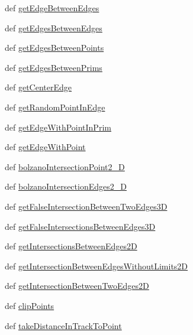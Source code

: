 \begin{DoxyCompactItemize}
\item 
def \hyperlink{namespacelib_1_1_geo_math_a1cb5b376bce2f81903d1dbbc919b8d59}{get\-Edge\-Between\-Edges}
\item 
def \hyperlink{namespacelib_1_1_geo_math_aa10dc1b2ad7b793acea0e1c59767e5f9}{get\-Edges\-Between\-Edges}
\item 
def \hyperlink{namespacelib_1_1_geo_math_a5aef1efb318f194168446a8022d9b9c8}{get\-Edges\-Between\-Points}
\item 
def \hyperlink{namespacelib_1_1_geo_math_a589b2ea7742e5d7e8f6cce2905244dc9}{get\-Edges\-Between\-Prims}
\item 
def \hyperlink{namespacelib_1_1_geo_math_a37ebf1a24e06dca5df1a2437652d49c7}{get\-Center\-Edge}
\item 
def \hyperlink{namespacelib_1_1_geo_math_a618f6b0be2b754a83a30bdd7feca94da}{get\-Random\-Point\-In\-Edge}
\item 
def \hyperlink{namespacelib_1_1_geo_math_a94906749395652cf1d1f18037c1896a2}{get\-Edge\-With\-Point\-In\-Prim}
\item 
def \hyperlink{namespacelib_1_1_geo_math_a7c60c5843495b38c5a2eb2ad803d6621}{get\-Edge\-With\-Point}
\item 
def \hyperlink{namespacelib_1_1_geo_math_a86caf2fbe19f664515f68aa233866319}{bolzano\-Intersection\-Point2\-\_\-D}
\item 
def \hyperlink{namespacelib_1_1_geo_math_ad045ebbcc162c4d19a29edbde5987605}{bolzano\-Intersection\-Edges2\-\_\-D}
\item 
def \hyperlink{namespacelib_1_1_geo_math_a68143d859f1993be8b6922ae91c50433}{get\-False\-Intersection\-Between\-Two\-Edges3\-D}
\item 
def \hyperlink{namespacelib_1_1_geo_math_a90b7d35fa67773986261fb8ef3d9cc34}{get\-False\-Intersections\-Between\-Edges3\-D}
\item 
def \hyperlink{namespacelib_1_1_geo_math_adec2c1be93c1cbd4b250034e74cc5f88}{get\-Intersections\-Between\-Edges2\-D}
\item 
def \hyperlink{namespacelib_1_1_geo_math_a3327674201e7fb90233a542759be6d6a}{get\-Intersection\-Between\-Edges\-Without\-Limits2\-D}
\item 
def \hyperlink{namespacelib_1_1_geo_math_a3f20c60bacfd828f1aed252bc60ff919}{get\-Intersection\-Between\-Two\-Edges2\-D}
\item 
def \hyperlink{namespacelib_1_1_geo_math_a6bc8b77f6a120c7e99aea1d1c745b38b}{clip\-Points}
\item 
def \hyperlink{namespacelib_1_1_geo_math_a2e54fdbf27e30971d03005a13884b93e}{take\-Distance\-In\-Track\-To\-Point}

\end{DoxyCompactItemize}
